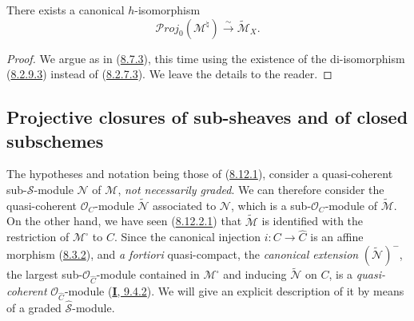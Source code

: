 \begin{proposition}[8.12.10]
\label{II.8.12.10}
There exists a canonical $h$-isomorphism
\begin{equation}
\label{II.8.12.10.1}
  \mathcal{P}\mathit{roj}_0(\mathcal{M}^{\natural})
  \xrightarrow{\sim}\widetilde{\mathcal{M}}_X.
\tag{8.12.10.1}
\end{equation}
\end{proposition}

\begin{proof}
We argue as in (\hyperref[II.8.7.3]{8.7.3}), this time using the
existence of the di-isomorphism (\hyperref[II.8.2.9.3]{8.2.9.3}) instead
of (\hyperref[II.8.2.7.3]{8.2.7.3}). We leave the details to the
reader.
\end{proof}

\subsection{Projective closures of sub-sheaves and of closed
subschemes}
\label{subsection:II.8.13}

\begin{env}[8.13.1]
\label{II.8.13.1}
The hypotheses and notation being those of
(\hyperref[II.8.12.1]{8.12.1}), consider a quasi-coherent
sub-$\mathcal{S}$-module $\mathcal{N}$ of $\mathcal{M}$, \emph{not
necessarily graded}. We can therefore consider the quasi-coherent
$\mathcal{O}_C$-module $\widetilde{\mathcal{N}}$ associated to $\mathcal{N}$,
which is a sub-$\mathcal{O}_C$-module of $\widetilde{\mathcal{M}}$. On the
other hand, we have seen (\hyperref[II.8.12.2.1]{8.12.2.1}) that
$\widetilde{\mathcal{M}}$ is identified with the restriction of
$\mathcal{M}^{\square}$ to $C$. Since the canonical injection
$i:C\to\widehat{C}$ is an affine morphism
(\hyperref[II.8.3.2]{8.3.2}), and \emph{a fortiori} quasi-compact, the
\emph{canonical extension} $(\widetilde{\mathcal{N}})^{-}$, the largest
sub-$\mathcal{O}_{\widehat{C}}$-module contained in
$\mathcal{M}^{\square}$ and inducing $\widetilde{\mathcal{N}}$ on $C$, is
a \emph{quasi-coherent} $\mathcal{O}_{\widehat{C}}$-module
(\hyperref[I.9.4.2]{\textbf{I}, 9.4.2}). We will give an explicit description of
it by means of a graded $\widehat{\mathcal{S}}$-module.
\end{env}

